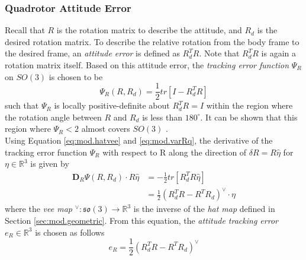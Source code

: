 \subsubsection*{Quadrotor Attitude Error}
Recall that $ R $ is the rotation matrix to describe the  attitude, and $ R_d $ is the desired rotation matrix. To describe the relative rotation from the body frame to the desired frame, an \textit{attitude error} is defined as $ R^T_dR $. Note that $ R^T_dR $ is again a rotation matrix itself.
Based on this attitude error, the \textit{tracking error function} $ \Psi_R $ on $ SO(3) $ is chosen to be 
\begin{equation}\label{eq:psiR}
\Psi_R(R,R_d)=\frac{1}{2}tr\left[I-R_d^TR\right]
\end{equation}
such that $ \Psi_R $ is locally positive-definite about $ R^T_dR=I $ within the region where the rotation angle between $ R $ and $ R_d $ is less than $ 180^\circ $. 
It can be shown that this region where $ \Psi_R<2 $ almost covers $ SO(3) $ \cite{Lee2010c}.\\
Using Equation \ref{eq:mod.hatvee} and \ref{eq:mod.varRq}, the derivative of the tracking error function $ \Psi_R $ with respect to R along the direction of $ \delta R=R\hat{\eta} $ for $ \eta\in\mathbb{R}^3 $ is given by
\begin{equation}\label{key}
\begin{aligned}
\mathbf{D}_R\Psi(R,R_d)\cdot R\hat{\eta}&=-\frac{1}{2}tr[R_d^TR\hat{\eta}]\\
&=\frac{1}{2}(R^T_dR-R^TR_d)^\vee\cdot\eta
\end{aligned}
\end{equation}
where the \textit{vee map} $ ^\vee:\mathfrak{so}(3)\rightarrow\mathbb{R}^3 $ is the inverse of the \textit{hat map} defined in Section \ref{sec:mod.geometric}. From this equation, the  \textit{attitude tracking error} $ e_R \in \mathbb{R}^3$ is chosen as follows
\begin{equation}\label{eq:con.eR}
e_R=\frac{1}{2}(R_d^TR-R^TR_d)^\vee
\end{equation}
